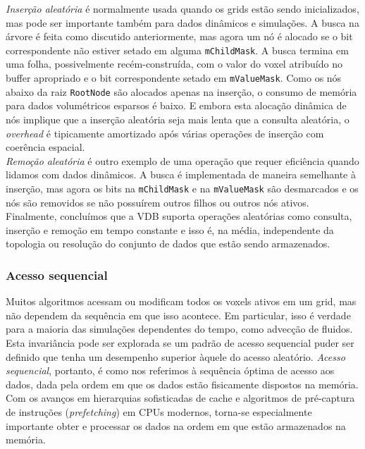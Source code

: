 \documentclass[12pt, a4paper, oneside]{book}
\begin{document}
\emph{Inserção aleatória} é normalmente usada quando os grids estão sendo inicializados, mas pode ser importante também para dados dinâmicos e simulações. A busca na árvore é feita como discutido anteriormente, mas agora um nó é alocado se o bit correspondente não estiver setado em alguma \texttt{mChildMask}. A busca termina em uma folha, possivelmente recém-construída, com o valor do voxel atribuído no buffer apropriado e o bit correspondente setado em \texttt{mValueMask}. Como os nós abaixo da raiz \texttt{RootNode} são alocados apenas na inserção, o consumo de memória para dados volumétricos esparsos é baixo. E embora esta alocação dinâmica de nós implique que a inserção aleatória seja mais lenta que a consulta aleatória, o {\it overhead} é tipicamente amortizado após várias operações de inserção com coerência espacial. \\

\emph{Remoção aleatória} é outro exemplo de uma operação que requer eficiência quando lidamos com dados dinâmicos. A busca é implementada de maneira semelhante à inserção, mas agora os bits na \texttt{mChildMask} e na \texttt{mValueMask} são desmarcados e os nós são removidos se não possuírem outros filhos ou outros nós ativos. \\

Finalmente, concluímos que a VDB suporta operações aleatórias como consulta, inserção e remoção em tempo constante e isso é, na média, independente da topologia ou resolução do conjunto de dados que estão sendo armazenados.
 
\subsubsection{Acesso sequencial}
Muitos algoritmos acessam ou modificam todos os voxels ativos em um grid, mas não dependem da sequência em que isso acontece. Em particular, isso é verdade para a maioria das simulações dependentes do tempo, como advecção de fluidos. Esta invariância pode ser explorada se um padrão de acesso sequencial puder ser definido que tenha um desempenho superior àquele do acesso aleatório. \emph{Acesso sequencial}, portanto, é como nos referimos à sequência óptima de acesso aos dados, dada pela ordem em que os dados estão fisicamente dispostos na memória. Com os avanços em hierarquias sofisticadas de cache e algoritmos de pré-captura de instruções ({\it prefetching}) em CPUs modernos, torna-se especialmente importante obter e processar os dados na ordem em que estão armazenados na memória. \\
\end{document}

